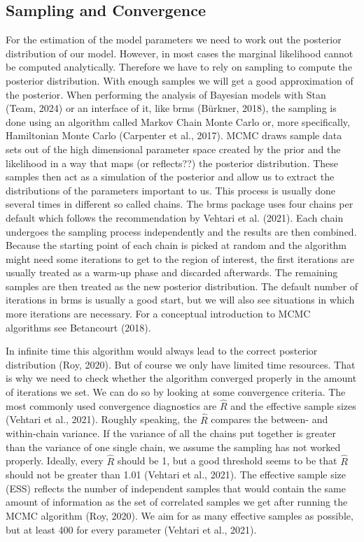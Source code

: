 \documentclass[
  doc,12pt,floatsintext]{apa7}
\begin{document}
\subsection{Sampling and Convergence}\label{sampling-and-convergence}

For the estimation of the model parameters we need to work out the posterior distribution of our model. However, in most cases the marginal likelihood cannot be computed analytically. Therefore we have to rely on sampling to compute the posterior distribution. With enough samples we will get a good approximation of the posterior. When performing the analysis of Bayesian models with Stan (Team, 2024) or an interface of it, like brms (Bürkner, 2018), the sampling is done using an algorithm called Markov Chain Monte Carlo or, more specifically, Hamiltonian Monte Carlo (Carpenter et al., 2017). MCMC draws sample data sets out of the high dimensional parameter space created by the prior and the likelihood in a way that maps (or reflects??) the posterior distribution. These samples then act as a simulation of the posterior and allow us to extract the distributions of the parameters important to us. This process is usually done several times in different so called chains. The brms package uses four chains per default which follows the recommendation by Vehtari et al. (2021). Each chain undergoes the sampling process independently and the results are then combined. Because the starting point of each chain is picked at random and the algorithm might need some iterations to get to the region of interest, the first iterations are usually treated as a warm-up phase and discarded afterwards. The remaining samples are then treated as the new posterior distribution. The default number of iterations in brms is usually a good start, but we will also see situations in which more iterations are necessary. For a conceptual introduction to MCMC algorithms see Betancourt (2018).

In infinite time this algorithm would always lead to the correct posterior distribution (Roy, 2020). But of course we only have limited time resources. That is why we need to check whether the algorithm converged properly in the amount of iterations we set. We can do so by looking at some convergence criteria. The most commonly used convergence diagnostics are \(\hat{R}\) and the effective sample sizes (Vehtari et al., 2021). Roughly speaking, the \(\hat{R}\) compares the between- and within-chain variance. If the variance of all the chains put together is greater than the variance of one single chain, we assume the sampling has not worked properly. Ideally, every \(\hat{R}\) should be 1, but a good threshold seems to be that \(\hat{R}\) should not be greater than 1.01 (Vehtari et al., 2021). The effective sample size (ESS) reflects the number of independent samples that would contain the same amount of information as the set of correlated samples we get after running the MCMC algorithm (Roy, 2020). We aim for as many effective samples as possible, but at least 400 for every parameter (Vehtari et al., 2021).
\end{document}

